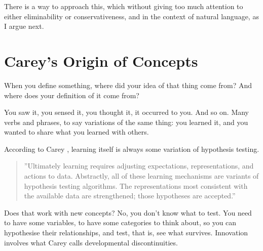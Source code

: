 \documentclass[graybox,envcountchap,sectrefs]{svmono}
\begin{document}
There is a way to approach this, which without giving too much attention to either eliminability or conservativeness, and in the context of natural language, as I argue next.


\section{Carey's Origin of Concepts}
\label{c4:s4}
When you define something, where did your idea of that thing come from? And where does your definition of it come from?

You saw it, you sensed it, you thought it, it occurred to you. And so on. Many verbs and phrases, to say variations of the same thing: you learned it, and you wanted to share what you learned with others.

According to Carey \cite{carey2009origin,carey2011precis}, learning itself is always some variation of hypothesis testing.

\begin{quote}
''Ultimately learning requires adjusting expectations, representations, and actions to data. Abstractly, all of these learning mechanisms are variants of hypothesis testing algorithms. The representations most consistent with the available data are strengthened; those hypotheses are accepted.'' \cite{carey2011precis}
\end{quote}

Does that work with new concepts? No, you don't know what to test. You need to have some variables, to have some categories to think about, so you can hypothesise their relationships, and test, that is, see what survives. Innovation involves what Carey calls developmental discontinuities.
\end{document}
